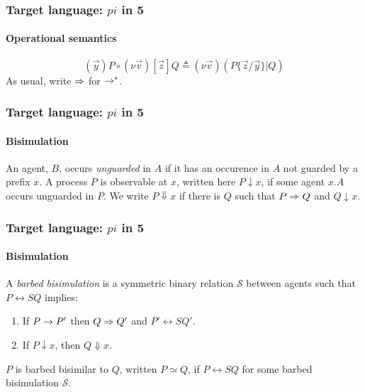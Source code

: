 \documentclass{beamer}
\begin{document}
\begin{frame}
  \frametitle{Target language: $pi$ in 5}
  \framesubtitle{Operational semantics}
  \begin{equation}
    (\vec{y})P \circ (\nu \vec{v})[\vec{z}]Q \triangleq (\nu \vec{v})(P\{\vec{z}/\vec{y}\} | Q) \nonumber
  \end{equation}
  As usual, write $\Rightarrow$ for $\rightarrow^*$.
\end{frame}

\begin{frame}
  \frametitle{Target language: $pi$ in 5}
  \framesubtitle{Bisimulation}
  \begin{definition}
    An agent, $B$, occurs \emph{unguarded} in $A$ if it has an occurence
    in $A$ not guarded by a prefix $x$. A process $P$ is observable at
    $x$, written here $P \downarrow x$, if some agent $x.A$ occurs
    unguarded in $P$. We write $P \Downarrow x$ if there is $Q$ such
    that $P \Rightarrow Q$ and $Q \downarrow x$.
  \end{definition}
\end{frame}

\begin{frame}
  \frametitle{Target language: $pi$ in 5}
  \framesubtitle{Bisimulation}
  \begin{definition}
    A \emph{barbed bisimulation} is a symmetric binary relation 
    ${\mathcal S}$ between agents such that $P\rel{S}Q$ implies:
    \begin{enumerate}
    \item If $P \rightarrow P'$ then $Q \Rightarrow Q'$ and $P'\rel{S} Q'$.
    \item If $P\downarrow x$, then $Q\Downarrow x$.
    \end{enumerate}
    $P$ is barbed bisimilar to $Q$, written
    $P \simeq Q$, if $P \rel{S} Q$ for some barbed bisimulation ${\mathcal S}$.
  \end{definition}
\end{frame}
\end{document}
